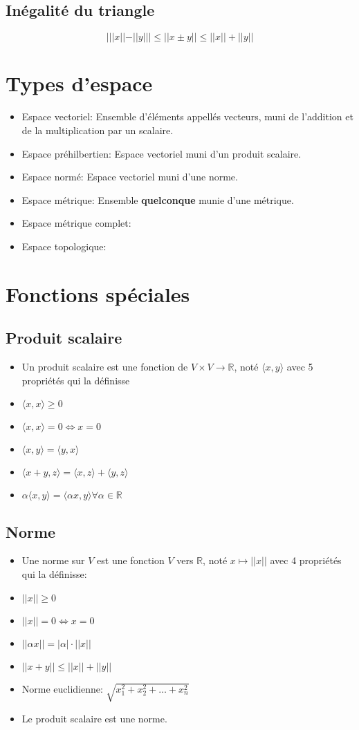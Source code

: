 \documentclass[12pt]{book}
\let\Bbb\mathbb
\theoremstyle{definition}
\begin{document}
\subsection{Inégalité du triangle}
$$| ||x|| - ||y|| | \leq ||x \pm y|| \leq ||x|| + ||y|| $$
\section{Types d'espace}
\begin{itemize}
    \item Espace vectoriel: Ensemble d'éléments appellés vecteurs, muni de l'addition et de la multiplication par un scalaire.
    \item Espace préhilbertien: Espace vectoriel muni d'un produit scalaire.
    \item Espace normé: Espace vectoriel muni d'une norme.
    \item Espace métrique: Ensemble \textbf{quelconque} munie d'une métrique.
    \item Espace métrique complet:
    \item Espace topologique:
\end{itemize}
\section{Fonctions spéciales}
\subsection{Produit scalaire}
\begin{itemize}
    \item Un produit scalaire est une fonction de $V \times V \to \Bbb R$, noté $\langle x, y \rangle$ avec 5 propriétés qui la définisse
    \item $\langle x, x \rangle \geq 0$
    \item $\langle x, x \rangle = 0 \iff x = 0$
    \item $\langle x, y \rangle = \langle y, x \rangle$
    \item $\langle x + y, z\rangle = \langle x, z \rangle + \langle y, z \rangle$
    \item $\alpha\langle x, y \rangle = \langle \alpha x, y \rangle \forall \alpha \in \Bbb R$
\end{itemize}
\subsection{Norme}
\begin{itemize}
    \item Une norme sur $V$ est une fonction $V$ vers $\Bbb R$, noté $x \mapsto ||x||$ avec 4 propriétés qui la définisse:
    \item $||x|| \geq 0$
    \item $||x|| = 0 \iff x = 0$
    \item $||\alpha x|| = |\alpha| \cdot ||x||$
    \item $||x + y || \leq ||x|| + ||y||$
    \item Norme euclidienne: $\sqrt{x_1^2 + x_2^2 + \dots + x_n^2}$
    \item Le produit scalaire est une norme.
\end{itemize}
\end{document}
